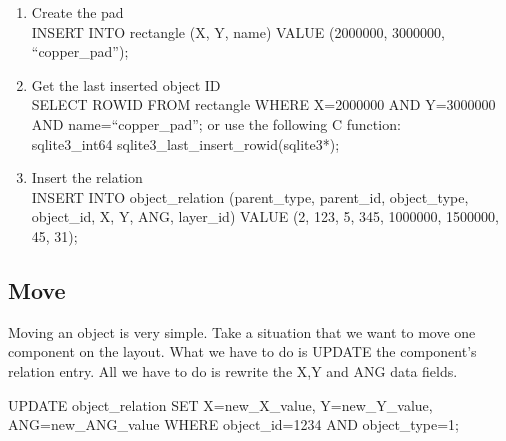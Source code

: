 \documentclass[12pt]{article}
\begin{document}
\begin{enumerate}
\item Create the pad\\
INSERT INTO rectangle (X, Y, name) VALUE (2000000, 3000000, ``copper\_pad'');
\item Get the last inserted object ID\\
SELECT ROWID FROM rectangle WHERE X=2000000 AND Y=3000000 AND
name=``copper\_pad''; or use the following C function:\\
sqlite3\_int64 sqlite3\_last\_insert\_rowid(sqlite3*);
\item Insert the relation\\
INSERT INTO object\_relation (parent\_type, parent\_id, object\_type,
object\_id, X, Y, ANG, layer\_id) VALUE (2, 123, 5, 345, 1000000, 1500000, 45,
31);
\end{enumerate}

\subsection{Move}

Moving an object is very simple. Take a situation that we want to move one
component on the layout. What we have to do is UPDATE the component's relation
entry. All we have to do is rewrite the X,Y and ANG data fields.

UPDATE object\_relation SET X=new\_X\_value, Y=new\_Y\_value,
ANG=new\_ANG\_value WHERE object\_id=1234 AND object\_type=1;
\end{document}

